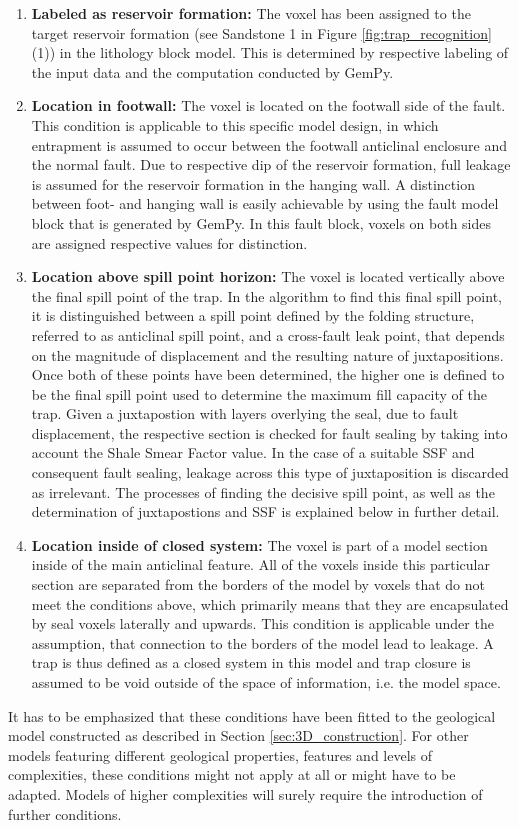 		\begin{enumerate}
			\item \textbf{Labeled as reservoir formation:} The voxel has been assigned to the target reservoir formation (see Sandstone 1 in Figure \ref{fig:trap_recognition} (1)) in the lithology block model. This is determined by respective labeling of the input data and the computation conducted by GemPy.
			\item \textbf{Location in footwall:} The voxel is located on the footwall side of the fault. This condition is applicable to this specific model design, in which entrapment is assumed to occur between the footwall anticlinal enclosure and the normal fault. Due to respective dip of the reservoir formation, full leakage is assumed for the reservoir formation in the hanging wall. A distinction between foot- and hanging wall is easily achievable by using the fault model block that is generated by GemPy. In this fault block, voxels on both sides are assigned respective values for distinction.
			\item \textbf{Location above spill point horizon:} The voxel is located vertically above the final spill point of the trap. In the algorithm to find this final spill point, it is distinguished between a spill point defined by the folding structure, referred to as anticlinal spill point, and a cross-fault leak point, that depends on the magnitude of displacement and the resulting nature of juxtapositions. Once both of these points have been determined, the higher one is defined to be the final spill point used to determine the maximum fill capacity of the trap.  Given a juxtapostion with layers overlying the seal, due to fault displacement, the respective section is checked for fault sealing by taking into account the Shale Smear Factor value. In the case of a suitable SSF and consequent fault sealing, leakage across this type of juxtaposition is discarded as irrelevant. The processes of finding the decisive spill point, as well as the determination of juxtapostions and SSF is explained below in further detail.
			\item \textbf{Location inside of closed system:} The voxel is part of a model section inside of the main anticlinal feature. All of the voxels inside this particular section are separated from the borders of the model by voxels that do not meet the conditions above, which primarily means that they are encapsulated by seal voxels laterally and upwards. This condition is applicable  under the assumption, that connection to the borders of the model lead to leakage. A trap is thus defined as a closed system in this model and trap closure is assumed to be void outside of the space of information, i.e. the model space.	
		\end{enumerate}
		It has to be emphasized that these conditions have been fitted to the geological model constructed as described in Section \ref{sec:3D_construction}. For other models featuring different geological properties, features and levels of complexities, these conditions might not apply at all or might have to be adapted. Models of higher complexities will surely require the introduction of further conditions.
		
